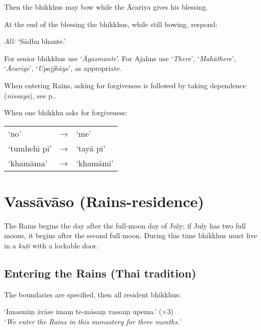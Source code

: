 Then the bhikkhus may bow while the Ācariya gives his blessing.

%
% 
% 

At the end of the blessing the bhikkhus, while still bowing, respond:

\emph{All:} ‘Sādhu bhante.’

For senior bhikkhus use ‘\emph{Āyasmante}’. For Ajahns use ‘\emph{There}’,
‘\emph{Mahāthere}’, ‘\emph{Ācariye}’, ‘\emph{Upajjhāye}’, as appropriate.

When entering Rains, asking for forgiveness is followed by taking dependence
(\emph{nissaya}), see p.\pageref{nissaya}.

When one bhikkhu asks for forgiveness:

\begin{tabular}{@{}lll@{}}
‘no’ & → & ‘me’\\
‘tumhehi pi’ & → & ‘tayā pi’\\
‘khamāma’ & → & ‘khamāmi’\\
\end{tabular}

\section{Vassāvāso (Rains-residence)}

The Rains begins the day after the full-moon day of July; if July has two full
moons, it begins after the second full moon. During this time bhikkhus must live
in a \emph{kuṭi} with a lockable door.

\subsection{Entering the Rains (Thai tradition)}

The boundaries are specified, then all resident bhikkhus:

‘Imasmiṃ āvāse imaṃ te-māsaṃ vassaṃ upema.’ (×3)\\
‘\emph{We enter the Rains in this monastery for three months.}’

